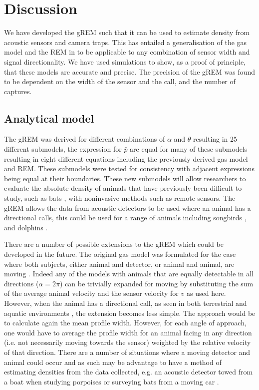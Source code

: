 \documentclass[a4paper,10pt,reqno,oneside]{amsart}
\begin{document}
\section*{Discussion}

We have developed the gREM such that it can be used to estimate density from acoustic sensors and camera traps. This has entailed a generalisation of the gas model and the REM in \citet{rowcliffe2008estimating} to be applicable to any combination of sensor width and signal directionality. We have used simulations to show, as a proof of principle, that these models are accurate and precise. The precision of the gREM was found to be dependent on the width of the sensor and the call, and the number of captures.

\subsection*{Analytical model}
The gREM was derived for different combinations of $\alpha$ and $\theta$ resulting in 25 different submodels, the expression for $\bar{p}$ are equal for many of these submodels resulting in eight different equations including the previously derived gas model and REM. These submodels were tested for consistency with adjacent expressions being equal at their boundaries. These new submodels will allow researchers to evaluate the absolute density of animals that have previously been difficult to study, such as bats \citep{clement2013estimating}, with noninvasive methods such as remote sensors. The gREM allows the data from acoustic detectors to be used where an animal has a directional calls, this could be used for a range of animals including songbirds \citep{blumstein2011acoustic}, and dolphins \citep{lammers2003directionality}. 

There are a number of possible extensions to the gREM which could be developed in the future. The original gas model was formulated for the case where both subjects, either animal and detector, or animal and animal, are moving \citep{Hutchinson_Waser_2007}. Indeed any of the models with animals that are equally detectable in all directions ($\alpha = 2\pi$) can be trivially expanded for moving by substituting the sum of the average animal velocity and the sensor velocity for $v$ as used here. However, when the animal has a directional call, as seen in both terrestrial and aquatic environments  \citep{lammers2003directionality,blumstein2011acoustic}, the extension becomes less simple. The approach would be to calculate again the mean profile width. However, for each angle of approach, one would have to average the profile width for an animal facing in any direction (i.e. not necessarily moving towards the sensor) weighted by the relative velocity of that direction. There are a number of situations where a moving detector and animal could occur and as such may be advantage to have a method of estimating densities from the data collected, e.g. an acoustic detector towed from a boat when studying porpoises \citep{kimura2014acoustic} or surveying bats from a moving car \citep{ahlen1999use}. 
\end{document}
